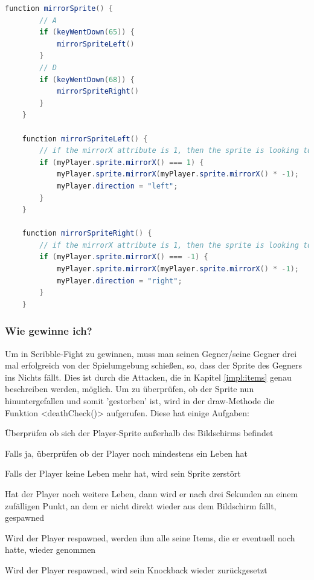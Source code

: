 \begin{lstlisting}[caption=Sprite Richtungswechsel,language=Java,label=lst:impl:mirrorSprite]
    function mirrorSprite() {
        // A
        if (keyWentDown(65)) {
            mirrorSpriteLeft()
        }
        // D
        if (keyWentDown(68)) {
            mirrorSpriteRight()
        }
    }
    
    function mirrorSpriteLeft() {
        // if the mirrorX attribute is 1, then the sprite is looking to the right
        if (myPlayer.sprite.mirrorX() === 1) {
            myPlayer.sprite.mirrorX(myPlayer.sprite.mirrorX() * -1);
            myPlayer.direction = "left";
        }
    }
    
    function mirrorSpriteRight() {
        // if the mirrorX attribute is 1, then the sprite is looking to the left
        if (myPlayer.sprite.mirrorX() === -1) {
            myPlayer.sprite.mirrorX(myPlayer.sprite.mirrorX() * -1);
            myPlayer.direction = "right";
        }
    }
\end{lstlisting}

\subsubsection{Wie gewinne ich?} \label{impl:win}
Um in Scribble-Fight zu gewinnen, muss man seinen Gegner/seine Gegner drei mal erfolgreich von der Spielumgebung schießen, so, dass der Sprite des Gegners ins Nichts fällt.
Dies ist durch die Attacken, die in Kapitel \ref{impl:items} genau beschreiben werden, möglich. 
Um zu überprüfen, ob der Sprite nun hinuntergefallen und somit 'gestorben' ist, wird in der draw-Methode die Funktion <deathCheck()> aufgerufen.
Diese hat einige Aufgaben:
\begin{compactitem}
    \item Überprüfen ob sich der Player-Sprite außerhalb des Bildschirms befindet
    \item Falls ja, überprüfen ob der Player noch mindestens ein Leben hat
    \item Falls der Player keine Leben mehr hat, wird sein Sprite zerstört
    \item Hat der Player noch weitere Leben, dann wird er nach drei Sekunden an einem zufälligen Punkt, an dem er nicht direkt wieder aus dem Bildschirm fällt, gespawned
    \item Wird der Player respawned, werden ihm alle seine Items, die er eventuell noch hatte, wieder genommen
    \item Wird der Player respawned, wird sein Knockback wieder zurückgesetzt
\end{compactitem}

